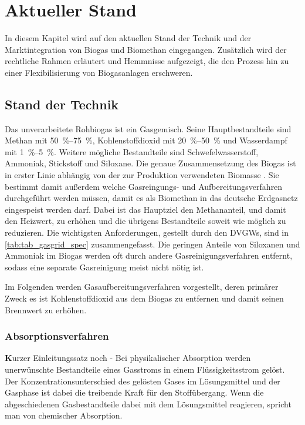 \section{Aktueller Stand}

In diesem Kapitel wird auf den aktuellen Stand der Technik und der Marktintegration von Biogas und Biomethan eingegangen. Zusätzlich wird der rechtliche Rahmen erläutert und Hemmnisse aufgezeigt, die den Prozess hin zu einer Flexibilisierung von Biogasanlagen erschweren.


\subsection{Stand der Technik}\label{chap:stateofart}
Das unverarbeitete Rohbiogas ist ein Gasgemisch. Seine Hauptbestandteile sind Methan mit \SIrange{50}{75}{\percent}, Kohlenstoffdioxid mit \SIrange{20}{50}{\percent} und Wasserdampf mit \SIrange{1}{5}{\percent}. Weitere mögliche Bestandteile sind Schwefelwasserstoff, Ammoniak, Stickstoff und Siloxane. Die genaue Zusammensetzung des Biogas ist in erster Linie abhängig von der zur Produktion verwendeten Biomasse \parencite{Rasi09}. Sie bestimmt damit außerdem welche Gasreingungs- und Aufbereitungsverfahren durchgeführt werden müssen, damit es als Biomethan in das deutsche Erdgasnetz eingespeist werden darf. Dabei ist das Hauptziel den Methananteil, und damit den Heizwert, zu erhöhen und die übrigens Bestandteile soweit wie möglich zu reduzieren. Die wichtigsten Anforderungen, gestellt durch den \glspl{DVGW}, sind in \ref{tab:tab_gasgrid_spec} zusammengefasst. Die geringen Anteile von Siloxanen und Ammoniak im Biogas werden oft durch andere Gasreinigungsverfahren entfernt, sodass eine separate Gasreinigung meist nicht nötig ist. \parencite{FNR14}\parencite{KoBi16}




Im Folgenden werden Gasaufbereitungsverfahren vorgestellt, deren primärer Zweck es ist Kohlenstoffdioxid aus dem Biogas zu entfernen und damit seinen Brennwert zu erhöhen.
\smallskip


\subsubsection{Absorptionsverfahren}\label{chap:absorp}

{\textbf Kurzer Einleitungssatz noch -} Bei physikalischer Absorption werden unerwünschte Bestandteile eines Gasstroms in einem Flüssigkeitsstrom gelöst. Der Konzentrationsunterschied des gelösten Gases im Lösungsmittel und der Gasphase ist dabei die treibende Kraft für den Stoffübergang. Wenn die abgeschiedenen Gasbestandteile dabei mit dem Lösungsmittel reagieren, spricht man von chemischer Absorption. \parencite{Rasi09} \smallskip

